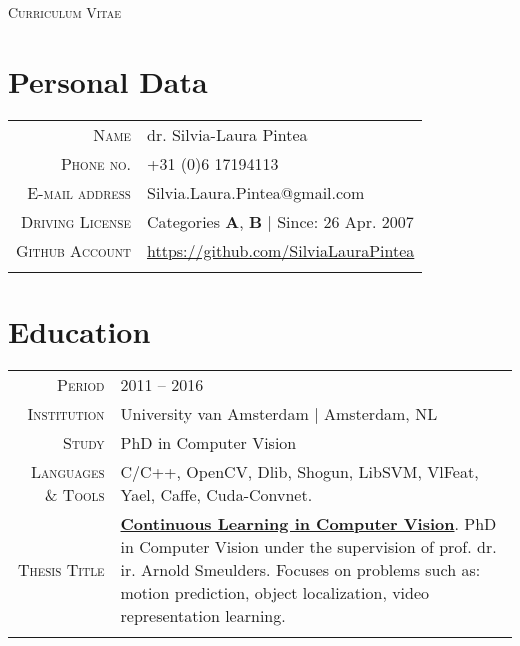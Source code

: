 \documentclass[a4paper, oneside, final]{scrartcl}
\newcommand{\gray}{\rowcolor[gray]{.90}}
\begin{document}
	\fontsize{9px}{11px}\selectfont
	\pagestyle{empty} %
	\begin{center} 
	\textsc{\Large\textsc{Curriculum Vitae}}
		\section{Personal Data}
		\begin{tabular}{r@{\hskip 0.3in}p{11.3cm}}
			\textsc{Name}            & dr. Silvia-Laura Pintea\\
			\textsc{Phone no.}       & +31 (0)6 17194113\\ 
			\textsc{E-mail address}  & Silvia.Laura.Pintea@gmail.com\\
			\textsc{Driving License} & Categories \textbf{A}, \textbf{B} $\mid$ Since: 26 Apr. 2007\\
			\textsc{Github Account}  & \href{https://github.com/SilviaLauraPintea}{https://github.com/SilviaLauraPintea}\\	
			\multicolumn{2}{c}{}\\ 
		\end{tabular}
		\section{Education}
		\begin{tabular}{r@{\hskip 0.3in}p{11.3cm}}
			\gray \textsc{Period}        & \textsc{2011 -- 2016}\\
			\textsc{Institution}         & University van Amsterdam $\mid$ Amsterdam, NL\\
			\textsc{Study}               & PhD in Computer Vision\\
			\textsc{Languages \& Tools}  & C\slash C++, OpenCV, Dlib, Shogun, LibSVM, VlFeat, Yael, Caffe, Cuda-Convnet.\\
			\textsc{Thesis Title}        & \textbf{\href{http://dare.uva.nl/search?identifier=90ad88f5-c16e-4450-86f2-23faa250fcab}{Continuous Learning in Computer Vision}}. 
				PhD in Computer Vision under the supervision of prof. dr. ir. Arnold Smeulders. 
				Focuses on problems such as: motion prediction, object localization, video representation learning.\\
			\multicolumn{2}{c}{}\\


\end{tabular}
\end{center}
\end{document}
